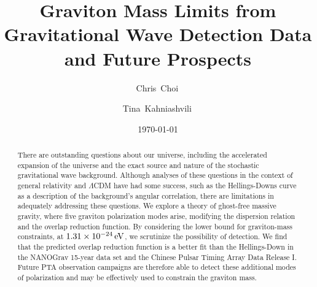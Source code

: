 \documentclass[prd,aps,psfig,nofootinbib,nobibnotes,superscriptaddress,preprintnumbers,times]{revtex4-2}\setlength{\topmargin}{-14mm}
\newcommand{\eV}{\,{\rm eV}}
\begin{document}
\title{Graviton Mass Limits from Gravitational Wave Detection Data and Future Prospects}

\date{\today}
\author{Chris~Choi\,}

\author{Tina~Kahniashvili\,}

\begin{abstract}
There are outstanding questions about our universe, including the accelerated expansion of the universe and the exact source and nature of the stochastic gravitational wave background. Although analyses of these questions in the context of general relativity and $\Lambda$CDM have had some success, such as the Hellings-Downs curve as a description of the background's angular correlation, there are limitations in adequately addressing these questions. We explore a theory of ghost-free massive gravity, where five graviton polarization modes arise, modifying the dispersion relation and the overlap reduction function. By considering the lower bound for graviton-mass constraints, at $1.31 \times 10^{-24} \eV$, we scrutinize the possibility of detection. We find that the predicted overlap reduction function is a better fit than the Hellings-Down in the NANOGrav 15-year data set and the Chinese Pulsar Timing Array Data Release I. Future PTA observation campaigns are therefore able to detect these additional modes of polarization and may be effectively used to constrain the graviton mass.

\end{abstract}

\maketitle
\end{document}
